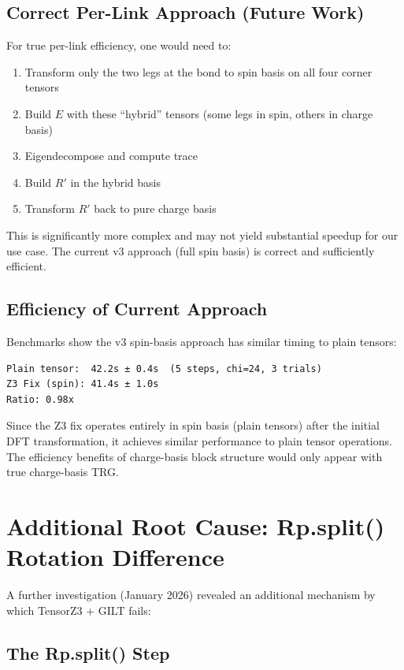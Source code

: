 \documentclass{article}
\begin{document}
\subsection{Correct Per-Link Approach (Future Work)}

For true per-link efficiency, one would need to:
\begin{enumerate}
    \item Transform only the two legs at the bond to spin basis on all four corner tensors
    \item Build $E$ with these ``hybrid'' tensors (some legs in spin, others in charge basis)
    \item Eigendecompose and compute trace
    \item Build $R'$ in the hybrid basis
    \item Transform $R'$ back to pure charge basis
\end{enumerate}

This is significantly more complex and may not yield substantial speedup for our use case. The current v3 approach (full spin basis) is correct and sufficiently efficient.

\subsection{Efficiency of Current Approach}

Benchmarks show the v3 spin-basis approach has similar timing to plain tensors:
\begin{verbatim}
Plain tensor:  42.2s ± 0.4s  (5 steps, chi=24, 3 trials)
Z3 Fix (spin): 41.4s ± 1.0s
Ratio: 0.98x
\end{verbatim}

Since the Z3 fix operates entirely in spin basis (plain tensors) after the initial DFT transformation, it achieves similar performance to plain tensor operations. The efficiency benefits of charge-basis block structure would only appear with true charge-basis TRG.

\section{Additional Root Cause: Rp.split() Rotation Difference}
\label{sec:rp_split_rotation}

A further investigation (January 2026) revealed an additional mechanism by which TensorZ3 + GILT fails:

\subsection{The Rp.split() Step}
\end{document}
